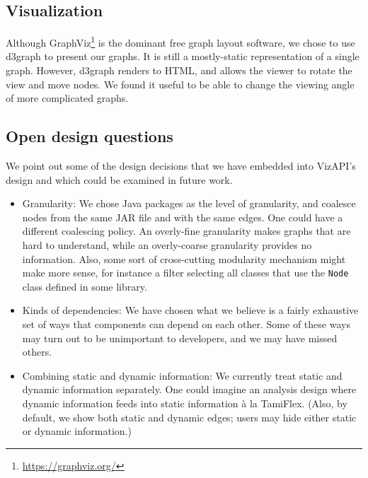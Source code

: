 \subsection{Visualization}
Although GraphViz\footnote{\url{https://graphviz.org/}} is the dominant
free graph layout software, we chose to use d3graph to present our graphs.
It is still a mostly-static representation of a single graph. However,
d3graph renders to HTML, and allows the viewer to rotate the view
and move nodes. We found it useful to be able
to change the viewing angle of more complicated graphs.

\subsection{Open design questions}
We point out some of the design decisions that we have embedded into VizAPI's
design and which could be examined in future work.
\begin{itemize}
\item Granularity: We chose Java packages as the level of granularity, and coalesce nodes from the same JAR file and with the same edges. One could have a different coalescing policy. An overly-fine granularity makes graphs that are hard to understand, while an overly-coarse granularity provides no information. Also, some sort of cross-cutting modularity mechanism might make more sense, for instance a filter selecting all classes that use the \texttt{Node} class defined in some library.
\item Kinds of dependencies: We have chosen what we believe is a fairly exhaustive set of ways that components can depend on each other. Some of these ways may turn out to be unimportant to developers, and we may have missed others.
\item Combining static and dynamic information: We currently treat static and dynamic information separately. One could imagine an analysis design where dynamic information feeds into static information à la TamiFlex. (Also, by default, we show both static and dynamic edges; users may hide either static or dynamic information.)
\end{itemize}
